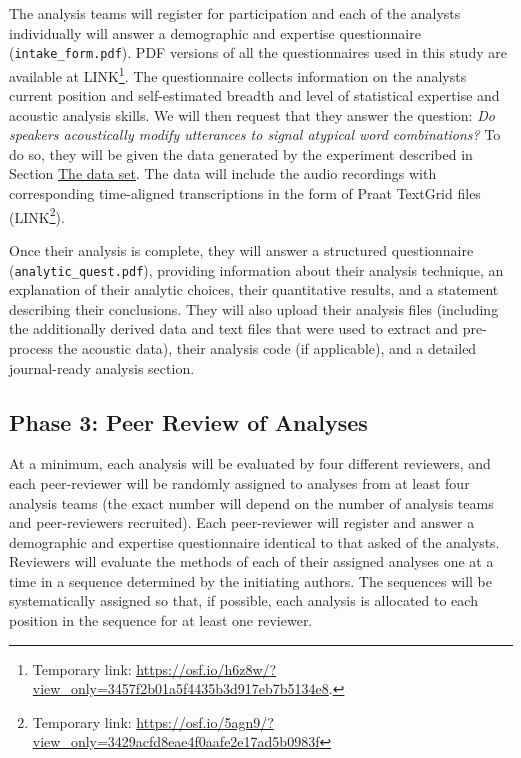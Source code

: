 \documentclass[Review,times,sageh]{sagej}
\begin{document}
The analysis teams will register for participation and each of the analysts individually will answer a demographic and expertise questionnaire (\texttt{intake\_form.pdf}).
PDF versions of all the questionnaires used in this study are available at LINK\footnote{Temporary link: \url{https://osf.io/h6z8w/?view_only=3457f2b01a5f4435b3d917eb7b5134e8}.}.
The questionnaire collects information on the analysts current position and self-estimated breadth and level of statistical expertise and acoustic analysis skills.
We will then request that they answer the question: \emph{Do speakers acoustically modify utterances to signal atypical word combinations?}
To do so, they will be given the data generated by the experiment described in Section \protect\hyperlink{s:dataset}{The data set}.
The data will include the audio recordings with corresponding time-aligned transcriptions in the form of Praat TextGrid files (LINK\footnote{Temporary link: \url{https://osf.io/5agn9/?view_only=3429acfd8eae4f0aafe2e17ad5b0983f}}).

Once their analysis is complete, they will answer a structured questionnaire (\texttt{analytic\_quest.pdf}), providing information about their analysis technique, an explanation of their analytic choices, their quantitative results, and a statement describing their conclusions.
They will also upload their analysis files (including the additionally derived data and text files that were used to extract and pre-process the acoustic data), their analysis code (if applicable), and a detailed journal-ready analysis section.

\hypertarget{phase-3-peer-review-of-analyses}{%
\subsection{Phase 3: Peer Review of Analyses}\label{phase-3-peer-review-of-analyses}}

At a minimum, each analysis will be evaluated by four different reviewers, and each peer-reviewer will be randomly assigned to analyses from at least four analysis teams (the exact number will depend on the number of analysis teams and peer-reviewers recruited).
Each peer-reviewer will register and answer a demographic and expertise questionnaire identical to that asked of the analysts.
Reviewers will evaluate the methods of each of their assigned analyses one at a time in a sequence determined by the initiating authors.
The sequences will be systematically assigned so that, if possible, each analysis is allocated to each position in the sequence for at least one reviewer.
\end{document}
